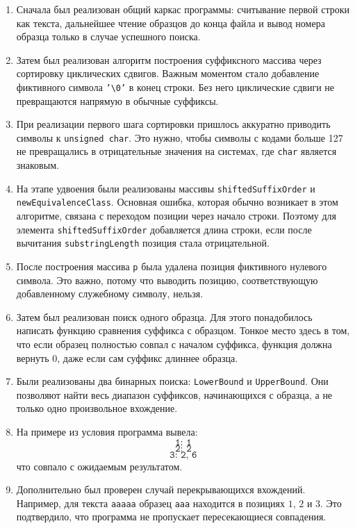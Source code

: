 \documentclass[12pt]{article}
\begin{document}
\begin{enumerate}
\item Сначала был реализован общий каркас программы: считывание первой строки как текста, дальнейшее чтение образцов до конца файла и вывод номера образца только в случае успешного поиска.

\item Затем был реализован алгоритм построения суффиксного массива через сортировку циклических сдвигов. Важным моментом стало добавление фиктивного символа \texttt{'\textbackslash 0'} в конец строки. Без него циклические сдвиги не превращаются напрямую в обычные суффиксы.

\item При реализации первого шага сортировки пришлось аккуратно приводить символы к \texttt{unsigned char}. Это нужно, чтобы символы с кодами больше 127 не превращались в отрицательные значения на системах, где \texttt{char} является знаковым.

\item На этапе удвоения были реализованы массивы \texttt{shiftedSuffixOrder} и \texttt{newEquivalenceClass}. Основная ошибка, которая обычно возникает в этом алгоритме, связана с переходом позиции через начало строки. Поэтому для элемента \texttt{shiftedSuffixOrder} добавляется длина строки, если после вычитания \texttt{substringLength} позиция стала отрицательной.

\item После построения массива \texttt{p} была удалена позиция фиктивного нулевого символа. Это важно, потому что выводить позицию, соответствующую добавленному служебному символу, нельзя.

\item Затем был реализован поиск одного образца. Для этого понадобилось написать функцию сравнения суффикса с образцом. Тонкое место здесь в том, что если образец полностью совпал с началом суффикса, функция должна вернуть $0$, даже если сам суффикс длиннее образца.

\item Были реализованы два бинарных поиска: \texttt{LowerBound} и \texttt{UpperBound}. Они позволяют найти весь диапазон суффиксов, начинающихся с образца, а не только одно произвольное вхождение.

\item На примере из условия программа вывела:
\[
\texttt{1: 1}
\]
\[
\texttt{2: 2}
\]
\[
\texttt{3: 2, 6}
\]
что совпало с ожидаемым результатом.

\item Дополнительно был проверен случай перекрывающихся вхождений. Например, для текста \texttt{aaaaa} образец \texttt{aaa} находится в позициях $1$, $2$ и $3$. Это подтвердило, что программа не пропускает пересекающиеся совпадения.
\end{enumerate}
\end{document}
